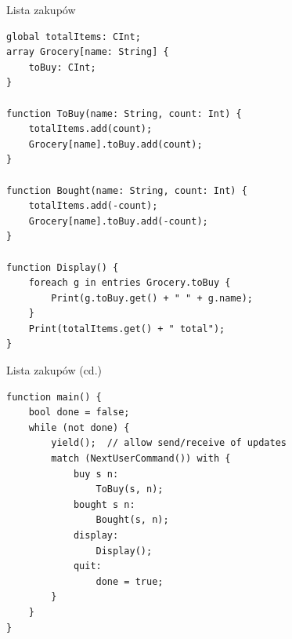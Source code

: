 \documentclass{beamer}
\begin{document}
\begin{frame}[fragile]{Lista zakupów}
    \begin{card}
        \begin{lstlisting}
global totalItems: CInt;
array Grocery[name: String] {
    toBuy: CInt;
}

function ToBuy(name: String, count: Int) {
    totalItems.add(count);
    Grocery[name].toBuy.add(count);
}

function Bought(name: String, count: Int) {
    totalItems.add(-count);
    Grocery[name].toBuy.add(-count);
}

function Display() {
    foreach g in entries Grocery.toBuy {
        Print(g.toBuy.get() + " " + g.name);
    }
    Print(totalItems.get() + " total");
}
        \end{lstlisting}
    \end{card}
\end{frame}

\begin{frame}[fragile]{Lista zakupów (cd.)}
    \begin{card}
        \begin{lstlisting}
function main() {
    bool done = false;
    while (not done) {
        yield();  // allow send/receive of updates
        match (NextUserCommand()) with {
            buy s n:
                ToBuy(s, n);
            bought s n:
                Bought(s, n);
            display:
                Display();
            quit:
                done = true;
        }
    }
}
        \end{lstlisting}
    \end{card}
\end{frame}
\end{document}
